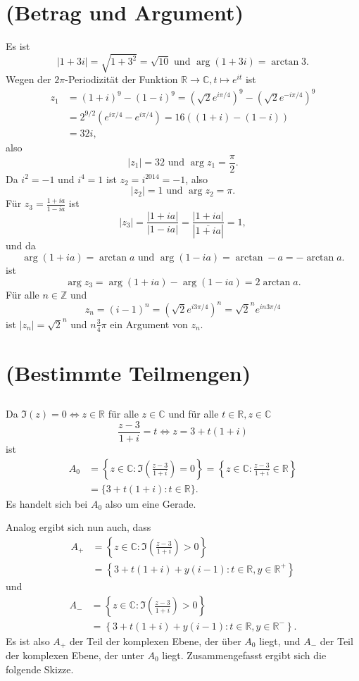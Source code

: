 \documentclass[a4paper,10pt]{article}
\theoremstyle{definition}
\newcommand{\Z}{\mathbb{Z}}
\newcommand{\R}{\mathbb{R}}
\newcommand{\C}{\mathbb{C}}
\begin{document}
\section{(Betrag und Argument)}
Es ist
\[
 |1+3i| = \sqrt{1+3^2} = \sqrt{10} \text{ und } \arg (1+3i) = \arctan 3.
\]
Wegen der $2\pi$-Periodizität der Funktion $\R \to \C, t \mapsto e^{it}$ ist
\begin{align*}
 z_1
 &= (1+i)^9 - (1-i)^9
 = \left(\sqrt{2}e^{i\pi/4}\right)^9 - \left(\sqrt{2}e^{-i\pi/4}\right)^9 \\
 &= 2^{9/2} (e^{i\pi/4}-e^{i\pi/4})
 = 16 ((1+i)-(1-i)) \\
 &= 32i,
\end{align*}
also
\[
 |z_1| = 32 \text{ und } \arg z_1 = \frac{\pi}{2}.
\]
Da $i^2 = -1$ und $i^4 = 1$ ist $ z_2 = i^{2014} = -1$, also
\[
 |z_2| = 1 \text{ und } \arg z_2 = \pi.
\]
Für $z_3 = \frac{1+ia}{1-ia}$ ist
\[
 \left|z_3\right|
 = \frac{|1+ia|}{|1-ia|}
 = \frac{|1+ia|}{\left|\overline{1+ia}\right|}
 = 1,
\]
und da
\[
 \arg (1+ia) = \arctan a \text{ und } \arg (1-ia) = \arctan -a = - \arctan a.
\]
ist
\[
 \arg z_3 = \arg (1+ia) - \arg (1-ia) = 2 \arctan a.
\]
Für alle $n \in \Z$ und
\[
 z_n = (i-1)^n = \left(\sqrt{2}e^{i3\pi/4}\right)^n = \sqrt{2}^n e^{in3\pi/4}
\]
ist $|z_n| = \sqrt{2}^n$ und $n\frac{3}{4}\pi$ ein Argument von $z_n$.





\section{(Bestimmte Teilmengen)}


\subsection{}
Da $\Im(z) = 0 \Leftrightarrow z \in \R$ für alle $z \in \C$ und für alle $t \in \R, z \in \C$
\[
 \frac{z-3}{1+i} = t \Leftrightarrow z = 3+t(1+i)
\]
ist
\begin{align*}
 A_0
 &= \left\{ z \in \C : \Im\left( \frac{z-3}{1+i} \right) = 0 \right\}
 = \left\{ z \in \C : \frac{z-3}{1+i} \in \R \right\} \\
 &= \{ 3+t(1+i) : t \in \R \}.
\end{align*}
Es handelt sich bei $A_0$ also um eine Gerade.

Analog ergibt sich nun auch, dass
\begin{align*}
 A_+
 &= \left\{z \in \C : \Im\left( \frac{z-3}{1+i} \right) > 0 \right\} \\
 &= \left\{3 + t(1+i) + y(i-1) : t \in \R, y \in \R^+\right\}
\end{align*}
und
\begin{align*}
 A_-
 &= \left\{z \in \C : \Im\left( \frac{z-3}{1+i} \right) > 0 \right\} \\
 &= \left\{3 + t(1+i) + y(i-1) : t \in \R, y \in \R^-\right\}.
\end{align*}
Es ist also $A_+$ der Teil der komplexen Ebene, der über $A_0$ liegt, und $A_-$ der Teil der komplexen Ebene, der unter $A_0$ liegt.
Zusammengefasst ergibt sich die folgende Skizze.
\end{document}

